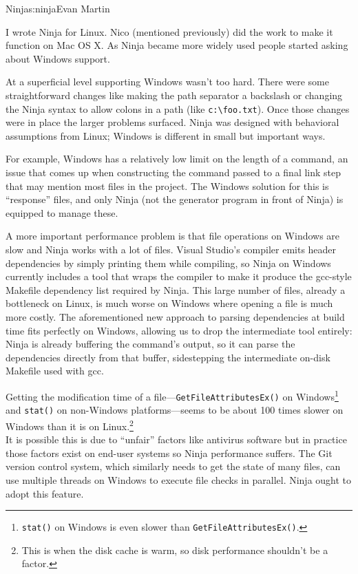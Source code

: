 \begin{aosachapter}{Ninja}{s:ninja}{Evan Martin}

I wrote Ninja for Linux. Nico (mentioned previously) did the work to
make it function on Mac OS X. As Ninja became more widely used people
started asking about Windows support.

At a superficial level supporting Windows wasn't too hard. There were
some straightforward changes like making the path separator a backslash
or changing the Ninja syntax to allow colons in a path (like
\texttt{c:\textbackslash{}foo.txt}). Once those changes were in place
the larger problems surfaced. Ninja was designed with behavioral
assumptions from Linux; Windows is different in small but important
ways.

For example, Windows has a relatively low limit on the length of a
command, an issue that comes up when constructing the command passed to
a final link step that may mention most files in the project. The
Windows solution for this is ``response'' files, and only Ninja (not the
generator program in front of Ninja) is equipped to manage these.

A more important performance problem is that file operations on Windows
are slow and Ninja works with a lot of files. Visual Studio's compiler
emits header dependencies by simply printing them while compiling, so
Ninja on Windows currently includes a tool that wraps the compiler to
make it produce the gcc-style Makefile dependency list required by
Ninja. This large number of files, already a bottleneck on Linux, is
much worse on Windows where opening a file is much more costly. The
aforementioned new approach to parsing dependencies at build time fits
perfectly on Windows, allowing us to drop the intermediate tool
entirely: Ninja is already buffering the command's output, so it can
parse the dependencies directly from that buffer, sidestepping the
intermediate on-disk Makefile used with gcc.

Getting the modification time of a file---\texttt{GetFileAttributesEx()}
on Windows\footnote{\texttt{stat()} on Windows is even slower than
  \texttt{GetFileAttributesEx()}.} and \texttt{stat()} on non-Windows
platforms---seems to be about 100 times slower on Windows than it is on
Linux.\footnote{This is when the disk cache is warm, so disk performance
  shouldn't be a factor.}\\It is possible this is due to ``unfair''
factors like antivirus software but in practice those factors exist on
end-user systems so Ninja performance suffers. The Git version control
system, which similarly needs to get the state of many files, can use
multiple threads on Windows to execute file checks in parallel. Ninja
ought to adopt this feature.


\end{aosachapter}

